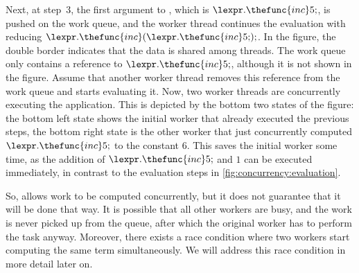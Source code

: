 Next, at step~3, the first argument to , which is $\lexpr.\thefunc{inc} 5;$, is pushed on the work queue, and the worker thread continues the evaluation with reducing $\lexpr.\thefunc{inc} ({\lexpr.\thefunc{inc} 5;});$.
In the figure, the double border indicates that the data is shared among threads.
The work queue only contains a reference to $\lexpr.\thefunc{inc} 5;$, although it is not shown in the figure.
Assume that another worker thread removes this reference from the work queue and starts evaluating it.
Now, two worker threads are concurrently executing the application.
This is depicted by the bottom two states of the figure: the bottom left state shows the initial worker that already executed the previous steps, the bottom right state is the other worker that just concurrently computed $\lexpr.\thefunc{inc} 5;$ to the constant $6$.
This saves the initial worker some time, as the addition of $\lexpr.\thefunc{inc} 5;$ and $1$ can be executed immediately, in contrast to the evaluation steps in \cref{fig:concurrency:evaluation}.

So,  allows work to be computed concurrently, but it does not guarantee that it will be done that way.
It is possible that all other workers are busy, and the work is never picked up from the queue, after which the original worker has to perform the task anyway.
Moreover, there exists a race condition where two workers start computing the same term simultaneously.
We will address this race condition in more detail later on.


